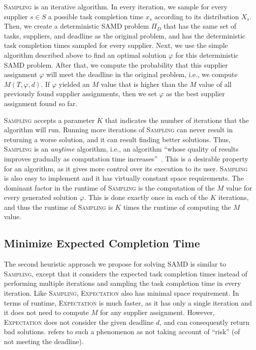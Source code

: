 \documentclass[letterpaper]{article}
\newcommand{\samd}{\ac{SAMD}\xspace}
\newcommand{\sampling}{\textsc{Sampling}\xspace}
\newcommand{\expectation}{\textsc{Expectation}\xspace}
\begin{document}
\sampling is an iterative algorithm.
In every iteration, we sample for every supplier $s\in S$ a possible task completion time $x_s$ according to its distribution $X_s$.
Then, we create a deterministic \samd problem $\Pi_D$ that has the same set of tasks, suppliers, and deadline as the original problem, and has the deterministic task completion times sampled for every supplier. Next, we use the simple algorithm described above to find an optimal solution $\varphi$ for this deterministic \samd problem. After that, we compute the probability that this supplier assignment $\varphi$ will meet the deadline in the original problem, i.e., we compute $M(T,\varphi,d)$. If $\varphi$ yielded an $M$ value that is higher than the $M$ value of all previously found supplier assignments, then we set $\varphi$ as the best supplier assignment found so far.





\sampling accepts a parameter $K$ that indicates the number of iterations that the algorithm will run. Running more iterations of \sampling can never result in returning a worse solution, and it can result finding better solutions. Thus, \sampling is an \emph{anytime} algorithm, i.e., an algorithm
``whose quality of results improves gradually as computation time increases''~\cite{zilberstein1996using}. This is a desirable property for an algorithm, as it gives more control over its execution to its user.
 \sampling is also easy to implement and it has virtually constant space requirements. The dominant factor in the runtime of \sampling is the computation of the $M$ value for every generated solution $\varphi$. This is done exactly once in each of the $K$ iterations, and thus the runtime of \sampling is $K$ times the runtime of computing the $M$ value.







\subsection{Minimize Expected Completion Time}\label{sec:expect}


The second heuristic approach we propose for solving \samd is
similar to \sampling, except that it considers the expected task completion times instead of performing multiple iterations and sampling the task completion time in every iteration.
Like \sampling, \expectation also has minimal space requirement. In terms of runtime, \expectation is much faster, as it has only a single iteration and it does not need to compute $M$ for any supplier assignment. However, \expectation does not consider the given deadline $d$, and can consequently return bad solutions. \citeauthor{loui1983optimal} refers to such a phenomenon as not taking account of ``risk'' (of not meeting the deadline).
\end{document}
